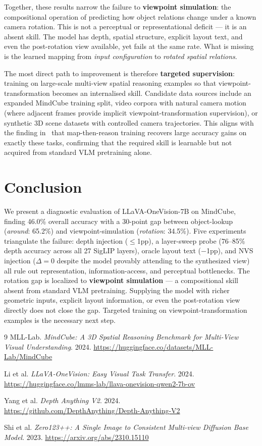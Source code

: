 \documentclass[11pt]{article}
\begin{document}
Together, these results narrow the failure to \textbf{viewpoint simulation}:
the compositional operation of predicting how object relations change under a
known camera rotation.
This is not a perceptual or representational deficit --- it is an absent skill.
The model has depth, spatial structure, explicit layout text, and even the
post-rotation view available, yet fails at the same rate.
What is missing is the learned mapping from \emph{input configuration} to
\emph{rotated spatial relations}.

The most direct path to improvement is therefore \textbf{targeted supervision}:
training on large-scale multi-view spatial reasoning examples so that
viewpoint-transformation becomes an internalised skill.
Candidate data sources include an expanded MindCube training split,
video corpora with natural camera motion (where adjacent frames provide
implicit viewpoint-transformation supervision), or synthetic 3D scene datasets
with controlled camera trajectories.
This aligns with the finding in~\cite{mindcube} that map-then-reason training
recovers large accuracy gains on exactly these tasks, confirming that the
required skill is learnable but not acquired from standard VLM pretraining alone.

\section{Conclusion}
We present a diagnostic evaluation of LLaVA-OneVision-7B on MindCube,
finding 46.0\% overall accuracy with a 30-point gap between object-lookup
(\textit{around}: 65.2\%) and viewpoint-simulation (\textit{rotation}: 34.5\%).
Five experiments triangulate the failure:
depth injection ($\leq$1pp), a layer-sweep probe (76--85\% depth accuracy
across all 27 SigLIP layers), oracle layout text ($-$1pp), and NVS injection
($\Delta = 0$ despite the model provably attending to the synthesized view)
all rule out representation, information-access, and perceptual bottlenecks.
The rotation gap is localized to \textbf{viewpoint simulation} --- a
compositional skill absent from standard VLM pretraining.
Supplying the model with richer geometric inputs, explicit layout information,
or even the post-rotation view directly does not close the gap.
Targeted training on viewpoint-transformation examples is the necessary next step.


\begin{thebibliography}{9}
MLL-Lab. \textit{MindCube: A 3D Spatial Reasoning Benchmark for
Multi-View Visual Understanding}. 2024.
\url{https://huggingface.co/datasets/MLL-Lab/MindCube}

Li et al. \textit{LLaVA-OneVision: Easy Visual Task Transfer}. 2024.
\url{https://huggingface.co/lmms-lab/llava-onevision-qwen2-7b-ov}

Yang et al. \textit{Depth Anything V2}. 2024.
\url{https://github.com/DepthAnything/Depth-Anything-V2}

Shi et al. \textit{Zero123++: A Single Image to Consistent Multi-view
Diffusion Base Model}. 2023.
\url{https://arxiv.org/abs/2310.15110}
\end{thebibliography}
\end{document}

